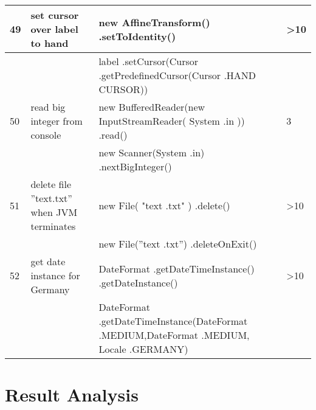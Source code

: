 \begin{longtable}{|p{}|p{}|p{}|p{}|}
		\rowcolor[HTML]{FFCCC9} 
		49                                & set cursor over label to hand                          & new AffineTransform() .setToIdentity()                                                                           & \textgreater{}10                        \\ \hline
		\rowcolor[HTML]{9AFF99} 
		&                                                        & label .setCursor(Cursor .getPredefinedCursor(Cursor .HAND CURSOR))                                               &                                         \\ \hline
		\rowcolor[HTML]{FFCCC9} 
		50                                & read big integer from console                          & new BufferedReader(new InputStreamReader( System .in )) .read()                                                  & 3                                       \\ \hline
		\rowcolor[HTML]{9AFF99} 
		&                                                        & new Scanner(System .in) .nextBigInteger()                                                                        &                                         \\ \hline
		\rowcolor[HTML]{FFCCC9} 
		51                                & delete file ”text.txt” when JVM terminates             & new File( "text .txt" )  .delete()                                                                               & \textgreater{}10                        \\ \hline
		\rowcolor[HTML]{9AFF99} 
		&                                                        & new File(”text .txt”) .deleteOnExit()                                                                            &                                         \\ \hline
		\rowcolor[HTML]{FFCCC9} 
		52                                & get date instance for Germany                          & DateFormat .getDateTimeInstance() .getDateInstance()                                                             & \textgreater{}10                        \\ \hline
		\rowcolor[HTML]{9AFF99} 
		&                                                        & DateFormat .getDateTimeInstance(DateFormat .MEDIUM,DateFormat .MEDIUM, Locale .GERMANY)                          &                                         \\ \hline
		
\end{longtable}

\section{Result Analysis}




